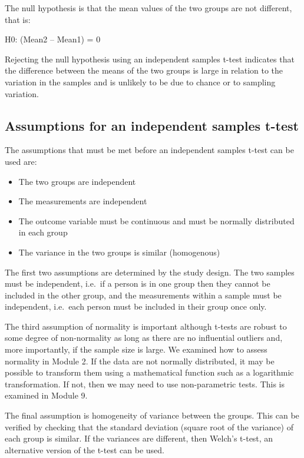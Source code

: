\documentclass[
]{memoir}
\providecommand{\tightlist}{%
  \setlength{\itemsep}{0pt}\setlength{\parskip}{0pt}}
\begin{document}
The null hypothesis is that the mean values of the two groups are not different, that is:

H0: (Mean2 -- Mean1) = 0

Rejecting the null hypothesis using an independent samples t-test indicates that the difference between the means of the two groups is large in relation to the variation in the samples and is unlikely to be due to chance or to sampling variation.

\hypertarget{assumptions-for-an-independent-samples-t-test}{%
\subsection{Assumptions for an independent samples t-test}\label{assumptions-for-an-independent-samples-t-test}}

The assumptions that must be met before an independent samples t-test can be used are:

\begin{itemize}
\tightlist
\item
  The two groups are independent
\item
  The measurements are independent
\item
  The outcome variable must be continuous and must be normally distributed in each group
\item
  The variance in the two groups is similar (homogenous)
\end{itemize}

The first two assumptions are determined by the study design. The two samples must be independent, i.e.~if a person is in one group then they cannot be included in the other group, and the measurements within a sample must be independent, i.e.~each person must be included in their group once only.

The third assumption of normality is important although t-tests are robust to some degree of non-normality as long as there are no influential outliers and, more importantly, if the sample size is large. We examined how to assess normality in Module 2. If the data are not normally distributed, it may be possible to transform them using a mathematical function such as a logarithmic transformation. If not, then we may need to use non-parametric tests. This is examined in Module 9.

The final assumption is homogeneity of variance between the groups. This can be verified by checking that the standard deviation (square root of the variance) of each group is similar. If the variances are different, then Welch's t-test, an alternative version of the t-test can be used.
\end{document}
